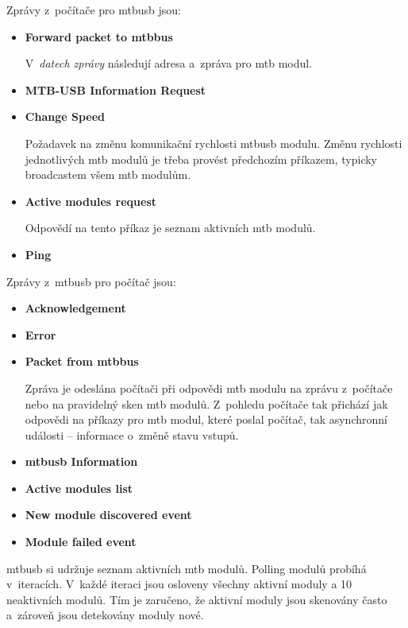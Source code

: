 Zprávy z~počítače pro \gls{mtbusb} jsou:

\begin{itemize}
\item \textbf{Forward packet to \gls{mtbbus}}

V~\textit{datech zprávy} následují adresa a~zpráva pro \gls{mtb} modul.

\item \textbf{MTB-USB Information Request}

\item \textbf{Change Speed}

Požadavek na změnu komunikační rychlosti \gls{mtbusb} modulu. Změnu rychlosti
jednotlivých \gls{mtb} modulů je třeba provést předchozím příkazem, typicky
broadcastem všem \gls{mtb} modulům.

\item \textbf{Active modules request}

Odpovědí na tento příkaz je seznam aktivních \gls{mtb} modulů.

\item \textbf{Ping}

\end{itemize}

Zprávy z~\gls{mtbusb} pro počítač jsou:

\begin{itemize}
\item \textbf{Acknowledgement}
\item \textbf{Error}
\item \textbf{Packet from \gls{mtbbus}}

Zpráva je odeslána počítači při odpovědi \gls{mtb} modulu na zprávu z~počítače
nebo na pravidelný sken \gls{mtb} modulů. Z~pohledu počítače tak přichází jak
odpovědi na příkazy pro \gls{mtb} modul, které poslal počítač, tak asynchronní
události – informace o~změně stavu vstupů.

\item \textbf{\gls{mtbusb} Information}

\item \textbf{Active modules list}

\item \textbf{New module discovered event}

\item \textbf{Module failed event}

\end{itemize}

\gls{mtbusb} si udržuje seznam aktivních \gls{mtb} modulů. Polling
modulů probíhá v~iteracích. V~každé iteraci jsou osloveny všechny aktivní
moduly a 10 neaktivních modulů. Tím je zaručeno, že aktivní moduly jsou
skenovány často a~zároveň jsou detekovány moduly nové.

